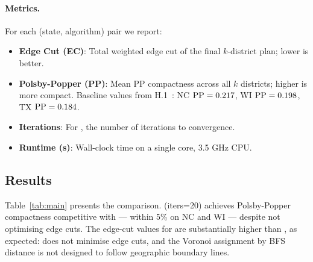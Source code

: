 \paragraph{Metrics.}
For each (state, algorithm) pair we report:
\begin{itemize}
\item \textbf{Edge Cut (EC)}: Total weighted edge cut of the final $k$-district
  plan; lower is better.
\item \textbf{Polsby-Popper (PP)}: Mean PP compactness across all $k$ districts;
  higher is more compact.
  Baseline values from H.1~\citep{h1paper}: NC $\mathrm{PP} = 0.217$, WI $\mathrm{PP} = 0.198$,
  TX $\mathrm{PP} = 0.184$.
\item \textbf{Iterations}: For \cvd{}, the number of iterations to convergence.
\item \textbf{Runtime (s)}: Wall-clock time on a single core, 3.5 GHz CPU.
\end{itemize}

\subsection{Results}

Table~\ref{tab:main} presents the comparison.
\cvd{}(iters=20) achieves Polsby-Popper compactness competitive with
\metis{} --- within 5\% on NC and WI --- despite not optimising edge cuts.
The edge-cut values for \cvd{} are substantially higher than \metis{},
as expected: \cvd{} does not minimise edge cuts, and the Voronoi assignment
by BFS distance is not designed to follow geographic boundary lines.

